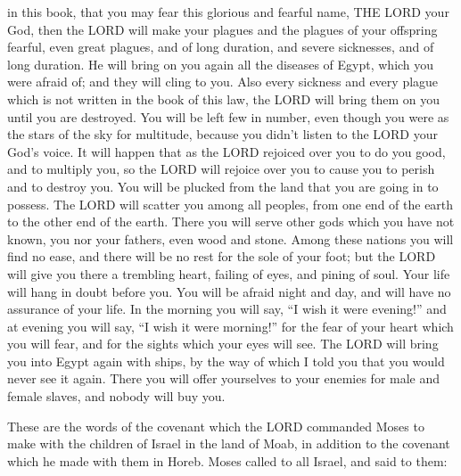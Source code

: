 in this book, that you may fear this glorious and fearful name, THE LORD your God,
\myverse{}then the LORD will make your plagues and the plagues of your offspring fearful,
even great plagues, and of long duration, and severe sicknesses, and of long duration.
\myverse{}He will bring on you again all the diseases of Egypt, which you were afraid
of; and they will cling to you.
\myverse{}Also every sickness and every plague which is not written in the book of
this law, the LORD will bring them on you until you are destroyed.
\myverse{}You will be left few in number, even though you were as the stars of the
sky for multitude, because you didn’t listen to the LORD your God’s voice.
\myverse{}It will happen that as the LORD rejoiced over you to do you good, and to
multiply you, so the LORD will rejoice over you to cause you to perish and to destroy you. You will be
plucked from the land that you are going in to possess.
\myverse{}The LORD will scatter you among all peoples, from one end of the earth to
the other end of the earth. There you will serve other gods which you have not known, you nor your fathers,
even wood and stone.
\myverse{}Among these nations you will find no ease, and there will be no rest for
the sole of your foot; but the LORD will give you there a trembling heart, failing of eyes, and pining
of soul.
\myverse{}Your life will hang in doubt before you. You will be afraid night and day,
and will have no assurance of your life.
\myverse{}In the morning you will say, “I wish it were evening!” and at evening you
will say, “I wish it were morning!” for the fear of your heart which you will fear, and for the sights
which your eyes will see.
\myverse{}The LORD will bring you into Egypt again with ships, by the way of which
I told you that you would never see it again. There you will offer yourselves to your enemies for male
and female slaves, and nobody will buy you.


\mychapter{} \myverse*{}These are the words of the covenant which the LORD commanded Moses
to make with the children of Israel in the land of Moab, in addition to the covenant which he made with
them in Horeb.
\myverse{}Moses called to all Israel, and said to them:

